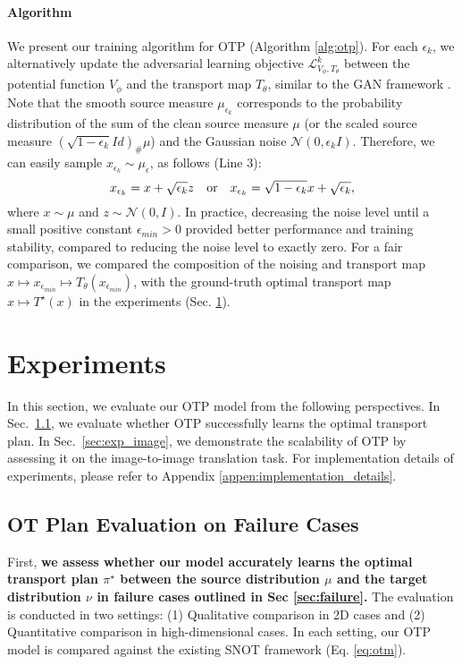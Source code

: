 \paragraph{Algorithm}
We present our training algorithm for OTP (Algorithm \ref{alg:otp}). For each $\epsilon_{k}$, we alternatively update the adversarial learning objective $\mathcal{L}^{k}_{V_{\phi}, T_{\theta}}$ between the potential function $V_{\phi}$ and the transport map $T_{\theta}$, similar to the GAN framework \citep{gan}. Note that the smooth source measure $\mu_{\epsilon_{k}}$ corresponds to the probability distribution of the sum of the clean source measure $\mu$ (or the scaled source measure $\left(\sqrt{1-\epsilon_{k}}Id\right)_{\#}\mu$) and the Gaussian noise $\mathcal{N}(0, \epsilon_{k} I)$. Therefore, we can easily sample $x_{\epsilon_{k}} \sim \mu_{\epsilon}$, as follows (Line 3):
\vspace{-5pt}
\begin{equation}
    x_{\epsilon_{k}} = x + \sqrt{\epsilon_{k}} z \quad \text{or} \quad
    x_{\epsilon_{k}} =\sqrt{1-\epsilon_{k}}x + \sqrt{\epsilon_{k}},
    \vspace{-5pt}
\end{equation}
where $x \sim \mu$ and $z \sim \mathcal{N}(0, I)$. In practice, decreasing the noise level until a small positive constant $\epsilon_{min} > 0$ provided better performance and training stability, compared to reducing the noise level to exactly zero. For a fair comparison, we compared the composition of the noising and transport map $x \mapsto x_{\epsilon_{min}} \mapsto T_{\theta}(x_{\epsilon_{min}})$, with the ground-truth optimal transport map $x \mapsto T^{\star}(x)$ in the experiments (Sec. \ref{sec:experiment}).





\section{Experiments} \label{sec:experiment}
In this section, we evaluate our OTP model from the following perspectives. In Sec.~\ref{sec:exp_syn}, we evaluate whether OTP successfully learns the optimal transport plan. In Sec.~\ref{sec:exp_image}, we demonstrate the scalability of OTP by assessing it on the image-to-image translation task.
For implementation details of experiments, please refer to Appendix \ref{appen:implementation_details}.

\subsection{OT Plan Evaluation on Failure Cases} \label{sec:exp_syn}
First, \textbf{we assess whether our model accurately learns the optimal transport plan $\pi^{\star}$ between the source distribution $\mu$ and the target distribution $\nu$ in failure cases outlined in Sec \ref{sec:failure}.} The evaluation is conducted in two settings: (1) Qualitative comparison in 2D cases and (2) Quantitative comparison in high-dimensional cases.
In each setting, our OTP model is compared against the existing SNOT framework (Eq. \ref{eq:otm}).



